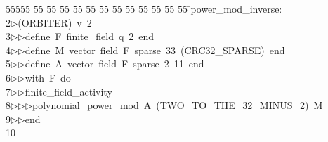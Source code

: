 %
%
\begin{tabbing}
55555 \= 55 \= 55 \= 55 \= 55 \= 55 \= 55 \= 55 \= 55 \= 55 \= 55 \= 55 \= 55 \= \>power\_mod\_inverse:\\[0pt]
2\>$\triangleright$\>(ORBITER)\ v\ 2\ \\[0pt]
3\>$\triangleright$\>$\triangleright$\>define\ F\ finite\_field\ q\ 2\ end\ \\[0pt]
4\>$\triangleright$\>$\triangleright$\>define\ M\ vector\ field\ F\ sparse\ 33\ (CRC32\_SPARSE)\ end\ \\[0pt]
5\>$\triangleright$\>$\triangleright$\>define\ A\ vector\ field\ F\ sparse\ 2\ 11\ end\ \\[0pt]
6\>$\triangleright$\>$\triangleright$\>with\ F\ do\ \\[0pt]
7\>$\triangleright$\>$\triangleright$\>finite\_field\_activity\ \\[0pt]
8\>$\triangleright$\>$\triangleright$\>$\triangleright$\>polynomial\_power\_mod\ A\ (TWO\_TO\_THE\_32\_MINUS\_2)\ M\ \\[0pt]
9\>$\triangleright$\>$\triangleright$\>end\\[0pt]
10\>\end{tabbing}
